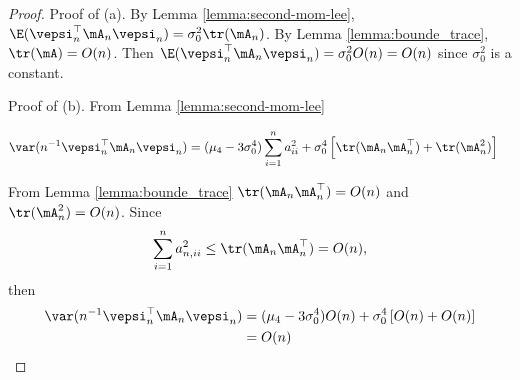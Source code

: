\documentclass[english,12pt]{book}\usepackage[]{graphicx}\usepackage[]{xcolor}
\begin{document}
\begin{proof}
Proof of (a). By Lemma \ref{lemma:second-mom-lee}, $\E(\vepsi_n^\top\mA_n\vepsi_n) = \sigma_{0}^2\tr(\mA_n)$. By Lemma \ref{lemma:bounde_trace}, $\tr(\mA) = O(n)$. Then $\E(\vepsi_n^\top\mA_n\vepsi_n) = \sigma_{0}^2 O(n) = O(n)$ since $\sigma_{0}^2$ is a constant. 


Proof of (b). From Lemma \ref{lemma:second-mom-lee}

\begin{equation}
\begin{aligned}
  \var(n^{-1}\vepsi_n^\top\mA_n\vepsi_n) & = (\mu_4 - 3\sigma^4_0)\sum_{i = 1}^na_{ii}^2+\sigma^4_0\left[\tr(\mA_n\mA_n^\top)+\tr(\mA^2_n)\right]
\end{aligned}
\end{equation}

From Lemma \ref{lemma:bounde_trace} $\tr(\mA_n\mA_n^\top) = O(n)$ and $\tr(\mA_n^2) = O(n)$. Since 
\begin{equation*}
  \sum_{i = 1}^n a_{n, ii}^2 \leq \tr(\mA_n\mA_n^\top) = O(n), 
\end{equation*}
%
then 
\begin{equation}
\begin{aligned}
  \var(n^{-1}\vepsi_n^\top\mA_n\vepsi_n) & = (\mu_4 - 3\sigma^4_0)O(n)+\sigma^4_0\left[O(n)+ O(n)\right] \\
  & = O(n)
\end{aligned}
\end{equation}


\end{proof}
\end{document}
